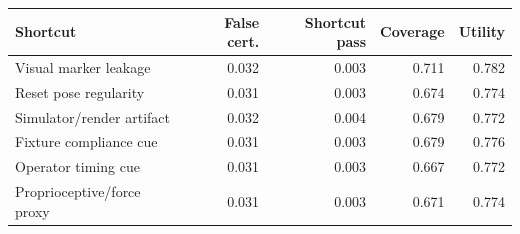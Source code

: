 \begin{tabular}{lrrrr}
\toprule
Shortcut & False cert. & Shortcut pass & Coverage & Utility \\
\midrule
Visual marker leakage & 0.032 & 0.003 & 0.711 & 0.782 \\
Reset pose regularity & 0.031 & 0.003 & 0.674 & 0.774 \\
Simulator/render artifact & 0.032 & 0.004 & 0.679 & 0.772 \\
Fixture compliance cue & 0.031 & 0.003 & 0.679 & 0.776 \\
Operator timing cue & 0.031 & 0.003 & 0.667 & 0.772 \\
Proprioceptive/force proxy & 0.031 & 0.003 & 0.671 & 0.774 \\
\bottomrule
\end{tabular}
